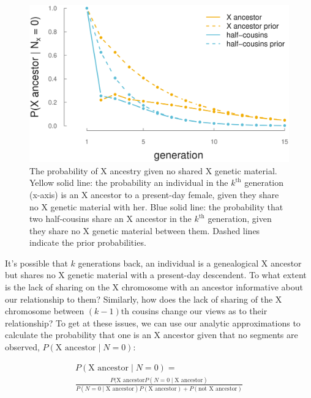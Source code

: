 \documentclass[9pt,twocolumn,twoside]{gsajnl}
\begin{document}
\begin{figure}[!ht]
  \centering
  \includegraphics[width=\linewidth]{images/prob-xanc-n0.eps}

  \caption{The probability of X ancestry given no shared X genetic material.
Yellow solid line: the probability an individual in the $k^\text{th}$
generation (x-axis) is an X ancestor to a present-day female, given they share
no X genetic material with her. Blue solid line: the probability that two
half-cousins share an X ancestor in the $k^\text{th}$ generation, given they
share no X genetic material between them. Dashed lines indicate the prior
probabilities.}

  \label{fig:prob-xanc-n0}
\end{figure}


It's possible that $k$ generations back, an individual is a genealogical X
ancestor but shares no X genetic material with a present-day descendent. To
what extent is the lack of sharing on the X chromosome with an ancestor
informative about our relationship to them? Similarly, how does the lack of
sharing of the X chromosome between $(k-1)\text{th}$ cousins change our views
as to their relationship?  To get at these issues, we can use our analytic
approximations to calculate the probability that one is an X ancestor given
that no segments are observed, $P(\text{X ancestor} \;|\; N = 0)$:

\begin{multline}
  P(\text{X ancestor}  \;|\; N = 0) = \\
  \frac{P(\text{X ancestor} P(N = 0 \;|\; \text{X ancestor})}{P(N = 0 \;|\; \text{X ancestor})P(\text{X ancestor}) + P(\text{not X ancestor})}
  \label{eq:post-x-ancs}
\end{multline}
\end{document}

